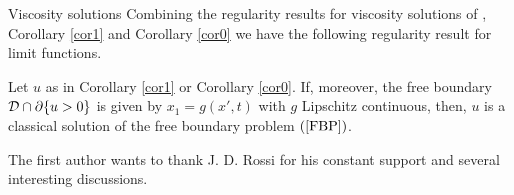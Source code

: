 \begin{section}{Viscosity solutions}
Combining the regularity results for viscosity solutions of \cite{F},
Corollary \ref{cor1} and Corollary \ref{cor0} we have
the following regularity result for limit functions.

\begin{cor}
\label{cor3}
Let $u$ as in Corollary \ref{cor1} or Corollary \ref{cor0}.
If, moreover,  the free
boundary ${\cal D}\cap\partial\{u>0\}$ is given by $x_1 = g(x',t)$ with $g$
 Lipschitz continuous,
then, $u$ is a classical solution of the free boundary problem $(\ref{FBP})$.
\end{cor}



\begin{ack}
The first author wants to thank J. D. Rossi for his constant support and 
several interesting discussions.
\end{ack}

\end{section}








